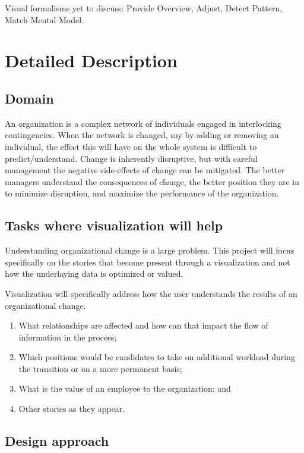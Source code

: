 \documentclass{soups}
\begin{document}
Visual formalisms yet to discuss: Provide Overview, Adjust, Detect Pattern, Match Mental Model\cite{yi2007toward}.

\section{Detailed Description}

\subsection{Domain}

An organization is a complex network of individuals engaged in interlocking contingencies\cite{glenn2006complexity}. When the network is changed, say by adding or removing an individual, the effect this will have on the whole system is difficult to predict/understand. Change is inherently disruptive, but with careful management the negative side-effects of change can be mitigated. The better managers understand the consequences of change, the better position they are in to minimize disruption, and maximize the performance of the organization. 

\subsection{Tasks where visualization will help}

Understanding organizational change is a large problem.  This project will focus specifically on the stories that become present through a visualization and not how the underlaying data is optimized or valued.

Visualization will specifically address how the user understands the results of an organizational change.

\begin{enumerate}
\item What relationships are affected and how can that impact the flow of information in the process;
\item Which positions would be candidates to take on additional workload during the transition or on a more permanent basis;
\item What is the value of an employee to the organization; and
\item Other stories as they appear.
\end{enumerate}

\subsection{Design approach}
\end{document}
